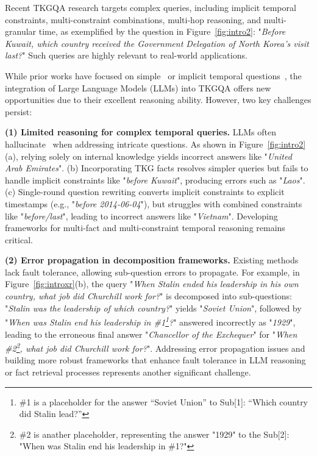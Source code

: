\documentclass[11pt]{article}
\begin{document}
Recent TKGQA research targets complex queries, including implicit temporal constraints, multi-constraint combinations, multi-hop reasoning, and multi-granular time, as exemplified by the question in Figure~\ref{fig:intro2}: "\textit{Before Kuwait, which country received the Government Delegation of North Korea's visit last?}" Such queries are highly relevant to real-world applications.

While prior works have focused on simple~\cite{saxena2021question,mavromatis2022tempoqr} or implicit temporal questions~\cite{chen2022temporal,qian2024timer4,jia2024faithful}, the integration of Large Language Models (LLMs) into TKGQA offers new opportunities due to their excellent reasoning ability. However, two key challenges persist:

\textbf{(1) Limited reasoning for complex temporal queries.} LLMs often hallucinate~\cite{azaria2024chat,zhao2024generating} when addressing intricate questions. As shown in Figure~\ref{fig:intro2}(a), relying solely on internal knowledge yields incorrect answers like "\textit{United Arab Emirates}". (b) Incorporating TKG facts resolves simpler queries but fails to handle implicit constraints like "\textit{before Kuwait}", producing errors such as "\textit{Laos}". (c) Single-round question rewriting converts implicit constraints to explicit timestamps (e.g., "\textit{before 2014-06-04}"), but struggles with combined constraints like "\textit{before/last}", leading to incorrect answers like "\textit{Vietnam}". Developing frameworks for multi-fact and multi-constraint temporal reasoning remains critical.

\textbf{(2) Error propagation in decomposition frameworks.} Existing methods lack fault tolerance, allowing sub-question errors to propagate. For example, in Figure~\ref{fig:introxr}(b), the query "\textit{When Stalin ended his leadership in his own country, what job did Churchill work for?}" is decomposed into sub-questions: "\textit{Stalin was the leadership of which country?}" yields "\textit{Soviet Union}", followed by "\textit{When was Stalin end his leadership in \#1\footnote{\footnotesize \#1 is a placeholder for the answer ``Soviet Union'' to Sub[1]: ``Which country did Stalin lead?''}?}" answered incorrectly as "\textit{1929}", leading to the erroneous final answer "\textit{Chancellor of the Exchequer}" for "\textit{When \#2\footnote{\footnotesize \#2 is anather placeholder, representing the answer "1929" to the Sub[2]: "When was Stalin end his leadership in \#1?"}, what job did Churchill work for?}". Addressing error propagation issues and building more robust frameworks that enhance fault tolerance in LLM reasoning or fact retrieval processes represents another significant challenge.
\end{document}
